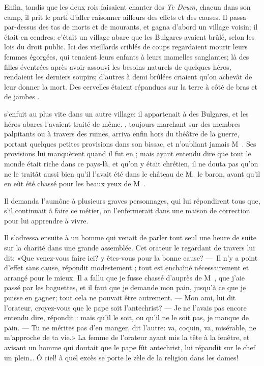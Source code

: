 Enfin, tandis que les deux rois faisaient chanter des \textit{Te Deum}, chacun
dans son camp, il prit le parti d’aller raisonner ailleurs des effets
et des causes. Il passa par-dessus des tas de morts et de mourants, et
gagna d’abord un village voisin; il était en cendres: c’était un
village abare que les Bulgares avaient brûlé, selon les lois du droit
public. Ici des vieillards criblés de coups regardaient mourir leurs
femmes égorgées, qui tenaient leurs enfants à leurs mamelles
sanglantes; là des filles éventrées après avoir assouvi les besoins
naturels de quelques héros, rendaient les derniers soupirs; d’autres à
demi brûlées criaient qu’on achevât de leur donner la mort. Des
cervelles étaient répandues sur la terre à côté de bras et de jambes
.

 s’enfuit au plus vite dans un autre village: il appartenait à
des Bulgares, et les héros abares l’avaient traité de même. ,
toujours marchant sur des membres palpitants ou à travers des ruines,
arriva enfin hors du théâtre de la guerre, portant quelques petites
provisions dans son bissac, et n’oubliant jamais M~. Ses provisions lui manquèrent quand il fut en ; mais
ayant entendu dire que tout le monde était riche dans ce pays-là, et
qu’on y était chrétien, il ne douta pas qu’on ne le traitât aussi bien
qu’il l’avait été dans le château de M.~le baron, avant qu’il en eût
été chassé pour les beaux yeux de M~.

Il demanda l’aumône à plusieurs graves personnages, qui lui répondirent
tous que, s’il continuait à faire ce métier, on l’enfermerait dans une
maison de correction pour lui apprendre à vivre.

Il s’adressa ensuite à un homme qui venait de parler tout seul une
heure de suite sur la charité dans une grande assemblée. Cet orateur le
regardant de travers lui dit: «Que venez-vous faire ici? y êtes-vous
pour la bonne cause? — Il n’y a point d’effet sans cause, répondit
modestement ; tout est enchaîné nécessairement et arrangé pour
le mieux. Il a fallu que je fusse chassé d’auprès de M~, que j’aie passé par les baguettes, et il faut que je demande
mon pain, jusqu’à ce que je puisse en gagner; tout cela ne pouvait être
autrement. — Mon ami, lui dit l’orateur, croyez-vous que le pape soit
l’antechrist? — Je ne l’avais pas encore entendu dire, répondit :
mais qu’il le soit, ou qu’il ne le soit pas, je manque de pain. — Tu ne
mérites pas d’en manger, dit l’autre: va, coquin, va, misérable, ne
m’approche de ta vie.» La femme de l’orateur ayant mis la tête à la
fenêtre, et avisant un homme qui doutait que le pape fût antechrist,
lui répandit sur le chef un plein… Ô ciel! à quel excès se porte le
zèle de la religion dans les dames!

